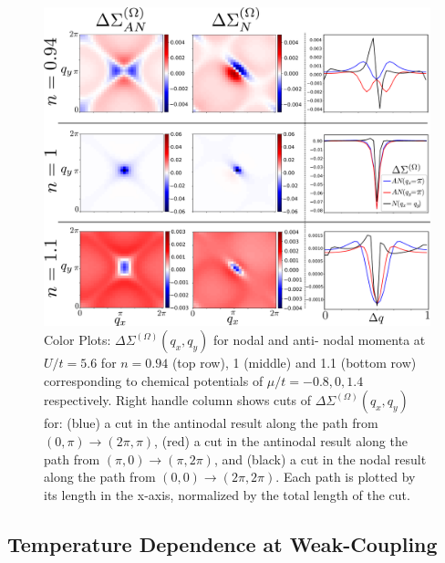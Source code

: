 \documentclass[twocolumn,notitlepage,prb,superscriptaddress,showpacs]{revtex4-1}
\begin{document}
\begin{figure}
\centering
    \includegraphics[width=\linewidth]{fig6.pdf}
\caption{\label{fig:fluct_DMFT_muvary} Color Plots: $\Delta \Sigma^{(\Omega)}(q_x,q_y)$ for nodal and anti- nodal momenta at $U/t= 5.6$ for $n=0.94$ (top row), 1 (middle) and 1.1 (bottom row) corresponding to chemical potentials of $\mu/t = -0.8, 0, 1.4 $ respectively.  Right handle column shows cuts of $\Delta \Sigma^{(\Omega)}(q_x,q_y)$ for: (blue) a cut in the antinodal result along the path from $(0,\pi) \to (2\pi,\pi)$, (red) a cut in the antinodal result along the path from $(\pi,0) \to (\pi,2\pi)$, and (black) a cut in the nodal result along the path from $(0,0)\to(2\pi,2\pi)$. Each path is plotted by its length in the x-axis, normalized by the total length of the cut. }
\end{figure} 






    


\subsection{Temperature Dependence at Weak-Coupling}
\end{document}
